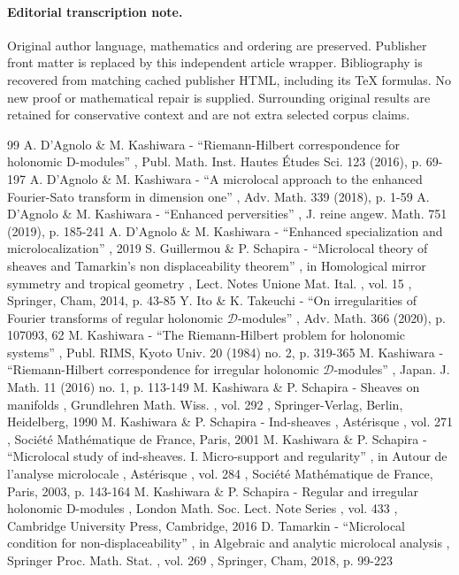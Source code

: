 \documentclass[11pt]{article}
\numberwithin{equation}{section}
\begin{document}
\paragraph{Editorial transcription note.}
Original author language, mathematics and ordering are preserved. Publisher front matter is replaced by this independent article wrapper. Bibliography is recovered from matching cached publisher HTML, including its TeX formulas. No new proof or mathematical repair is supplied. Surrounding original results are retained for conservative context and are not extra selected corpus claims.
\clearpage

\begin{thebibliography}{99}
 A. D’Agnolo \& M. Kashiwara - “Riemann-Hilbert correspondence for holonomic D-modules” , Publ. Math. Inst. Hautes Études Sci. 123 (2016), p. 69-197
 A. D’Agnolo \& M. Kashiwara - “A microlocal approach to the enhanced Fourier-Sato transform in dimension one” , Adv. Math. 339 (2018), p. 1-59
 A. D’Agnolo \& M. Kashiwara - “Enhanced perversities” , J. reine angew. Math. 751 (2019), p. 185-241
 A. D’Agnolo \& M. Kashiwara - “Enhanced specialization and microlocalization” , 2019
 S. Guillermou \& P. Schapira - “Microlocal theory of sheaves and Tamarkin’s non displaceability theorem” , in Homological mirror symmetry and tropical geometry , Lect. Notes Unione Mat. Ital. , vol. 15 , Springer, Cham, 2014, p. 43-85
 Y. Ito \& K. Takeuchi - “On irregularities of Fourier transforms of regular holonomic $\mathcal{D}$-modules” , Adv. Math. 366 (2020), p. 107093, 62
 M. Kashiwara - “The Riemann-Hilbert problem for holonomic systems” , Publ. RIMS, Kyoto Univ. 20 (1984) no. 2, p. 319-365
 M. Kashiwara - “Riemann-Hilbert correspondence for irregular holonomic $\mathcal{D}$-modules” , Japan. J. Math. 11 (2016) no. 1, p. 113-149
 M. Kashiwara \& P. Schapira - Sheaves on manifolds , Grundlehren Math. Wiss. , vol. 292 , Springer-Verlag, Berlin, Heidelberg, 1990
 M. Kashiwara \& P. Schapira - Ind-sheaves , Astérisque , vol. 271 , Société Mathématique de France, Paris, 2001
 M. Kashiwara \& P. Schapira - “Microlocal study of ind-sheaves. I. Micro-support and regularity” , in Autour de l’analyse microlocale , Astérisque , vol. 284 , Société Mathématique de France, Paris, 2003, p. 143-164
 M. Kashiwara \& P. Schapira - Regular and irregular holonomic D-modules , London Math. Soc. Lect. Note Series , vol. 433 , Cambridge University Press, Cambridge, 2016
 D. Tamarkin - “Microlocal condition for non-displaceability” , in Algebraic and analytic microlocal analysis , Springer Proc. Math. Stat. , vol. 269 , Springer, Cham, 2018, p. 99-223
\end{thebibliography}
\end{document}
